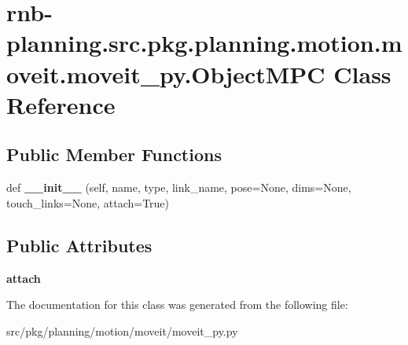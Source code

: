 \hypertarget{classrnb-planning_1_1src_1_1pkg_1_1planning_1_1motion_1_1moveit_1_1moveit__py_1_1_object_m_p_c}{}\section{rnb-\/planning.src.\+pkg.\+planning.\+motion.\+moveit.\+moveit\+\_\+py.\+Object\+M\+PC Class Reference}
\label{classrnb-planning_1_1src_1_1pkg_1_1planning_1_1motion_1_1moveit_1_1moveit__py_1_1_object_m_p_c}
\subsection*{Public Member Functions}
\begin{DoxyCompactItemize}
\item 
\mbox{\label{classrnb-planning_1_1src_1_1pkg_1_1planning_1_1motion_1_1moveit_1_1moveit__py_1_1_object_m_p_c_aef3d58b0a2deb174025f44c7a4c17ef9}} 
def {\bfseries \+\_\+\+\_\+init\+\_\+\+\_\+} (self, name, type, link\+\_\+name, pose=None, dims=None, touch\+\_\+links=None, attach=True)
\end{DoxyCompactItemize}
\subsection*{Public Attributes}
\begin{DoxyCompactItemize}
\item 
\mbox{\label{classrnb-planning_1_1src_1_1pkg_1_1planning_1_1motion_1_1moveit_1_1moveit__py_1_1_object_m_p_c_a1ee12c537a05803123ff81d32c1d484a}} 
{\bfseries attach}
\end{DoxyCompactItemize}


The documentation for this class was generated from the following file\+:\begin{DoxyCompactItemize}
\item 
src/pkg/planning/motion/moveit/moveit\+\_\+py.\+py\end{DoxyCompactItemize}
